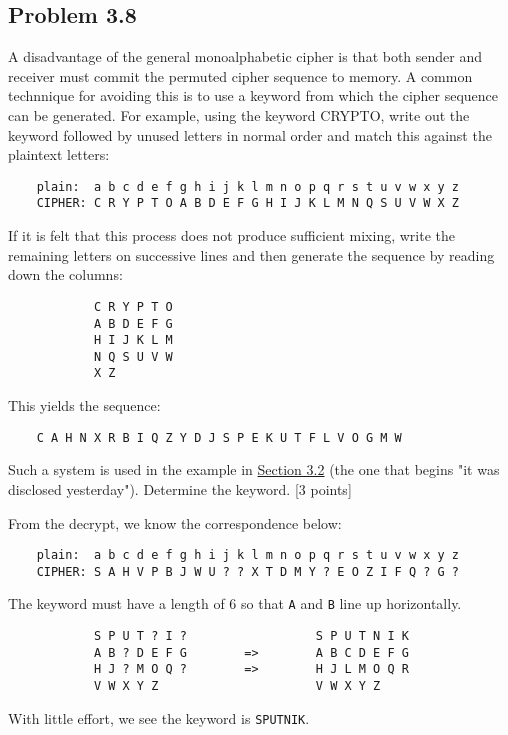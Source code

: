 \documentclass[../hw_sols.tex]{subfiles}
\begin{document}
\subsection*{Problem 3.8}

A disadvantage of the general monoalphabetic cipher is that both sender and 
receiver must commit the permuted cipher sequence to memory. A common 
technnique for avoiding this is to use a keyword from which the cipher 
sequence can be generated. For example, using the keyword CRYPTO, write out 
the keyword followed by unused letters in normal order and match this against 
the plaintext letters:
\begin{verbatim}
    plain:  a b c d e f g h i j k l m n o p q r s t u v w x y z
    CIPHER: C R Y P T O A B D E F G H I J K L M N Q S U V W X Z
\end{verbatim}

\noindent If it is felt that this process does not produce sufficient mixing, 
write the remaining letters on successive lines and then generate the sequence 
by reading down the columns:
\begin{verbatim}
            C R Y P T O
            A B D E F G
            H I J K L M
            N Q S U V W
            X Z
\end{verbatim}

\noindent This yields the sequence:
\begin{verbatim}
    C A H N X R B I Q Z Y D J S P E K U T F L V O G M W
\end{verbatim}

\noindent Such a system is used in the example in 
\href{run:../Cryptography and Network Security.pdf}{Section 3.2} (the one that 
begins "it was disclosed yesterday"). Determine the keyword. [3 points]

\begin{solution}

From the decrypt, we know the correspondence below:
\begin{verbatim}
    plain:  a b c d e f g h i j k l m n o p q r s t u v w x y z
    CIPHER: S A H V P B J W U ? ? X T D M Y ? E O Z I F Q ? G ?	
\end{verbatim}

\noindent The keyword must have a length of 6 so that \verb|A| and \verb|B| 
line up horizontally.
\begin{verbatim}
            S P U T ? I ?                  S P U T N I K
            A B ? D E F G        =>        A B C D E F G
            H J ? M O Q ?        =>        H J L M O Q R
            V W X Y Z                      V W X Y Z
\end{verbatim}

\noindent With little effort, we see the keyword is \verb|SPUTNIK|.

\end{solution}
\end{document}
